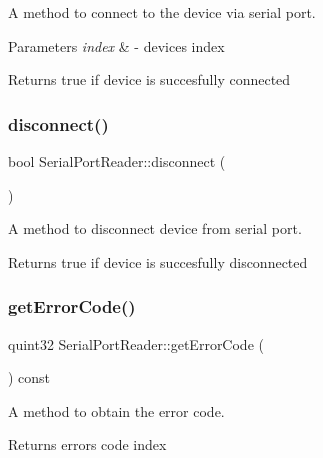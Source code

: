 A method to connect to the device via serial port. 


\begin{DoxyParams}{Parameters}
{\em index} & -\/ device\textquotesingle{}s index \\
\hline
\end{DoxyParams}
\begin{DoxyReturn}{Returns}
true if device is succesfully connected 
\end{DoxyReturn}
\mbox{\label{class_serial_port_reader_a40d30745fd700e05d534b38c4ba4939b}} 
\subsubsection{disconnect()}
{\footnotesize\ttfamily bool Serial\+Port\+Reader\+::disconnect (\begin{DoxyParamCaption}{ }\end{DoxyParamCaption})}



A method to disconnect device from serial port. 

\begin{DoxyReturn}{Returns}
true if device is succesfully disconnected 
\end{DoxyReturn}
\mbox{\label{class_serial_port_reader_a33a6f505ebf902bf3a3f64970c6a7cec}} 
\subsubsection{get\+Error\+Code()}
{\footnotesize\ttfamily quint32 Serial\+Port\+Reader\+::get\+Error\+Code (\begin{DoxyParamCaption}{ }\end{DoxyParamCaption}) const}



A method to obtain the error code. 

\begin{DoxyReturn}{Returns}
error\textquotesingle{}s code index 
\end{DoxyReturn}
\mbox{\label{class_serial_port_reader_a5a919fb6b06f5505de1aababcde045f6}} 
